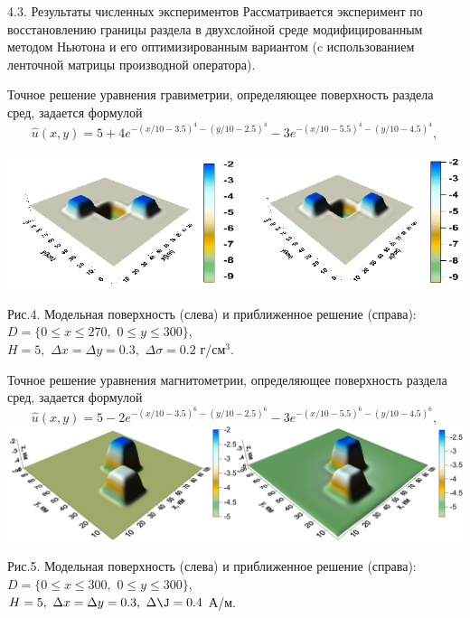 \documentclass[10pt,pdf, mathserif, hyperref={unicode}]{beamer}
\begin{document}
\begin{frame}{4.3. Результаты численных экспериментов}
	Рассматривается эксперимент по восстановлению границы раздела в двухслойной среде модифицированным методом Ньютона и его оптимизированным вариантом (c использованием ленточной матрицы производной оператора).
	
	Точное решение уравнения гравиметрии, определяющее поверхность раздела сред, задается формулой
	$$\hat{u}(x,y)=5+4e^{-(x/10-3.5)^4-(y/10-2.5)^4}-3e^{-(x/10-5.5)^4-(y/10-4.5)^4},$$
	\centering
		
	\includegraphics[width=\textwidth, height=0.35\textheight]{gravy_kiev2014.png}
	
	Рис.4. Модельная поверхность (слева) и приближенное решение (справа): $D=\{0\le x\le 270, \,\,0\le y\le 300\}$, \\ $  H=5,\,\,\Delta x=\Delta y=0.3,\,\,\Delta\sigma=0.2$ г/см$^3$.
\end{frame}
\begin{frame}
	Точное решение уравнения магнитометрии, определяющее поверхность раздела сред, задается формулой
	$$\hat{u}(x,y)=5-2e^{-(x/10-3.5)^6-(y/10-2.5)^6}-3e^{-(x/10-5.5)^6-(y/10-4.5)^6},$$
	\centering
	\includegraphics[width=\textwidth, height=0.3\textheight]{magne_kiev2014.png}
	
	Рис.5. Модельная поверхность (слева) и приближенное решение (справа): $D=\{0\le x\le 300, \,\,0\le y\le 300\}$, \\ $  H=5,\,\,\Delta x=\Delta y=0.3,\,\,\Delta\J=0.4$ А/м.
\end{frame}
\end{document}

